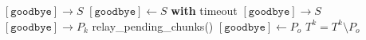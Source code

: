 \documentclass{article}
\begin{document}
\pagestyle{empty}

\newcommand{\send}{\Rightarrow}
\newcommand{\sendto}{\rightarrow}
\algrenewcommand{}

\begin{algorithmic}

  \Repeat
  \State $[\mathtt{goodbye}] \sendto S$
  \State $[\mathtt{goodbye}] \gets S$ \textbf{with} timeout
  \State $[\mathtt{goodbye}] \sendto S$
  \State $[\mathtt{goodbye}] \sendto P_k$
  \EndFor
  \State relay\_pending\_chunks()
  \EndProcedure
  \newline
  \State $[\mathtt{goodbye}] \gets P_o$
  \State $T^k = T^k \setminus P_o$
  \EndWhile
  \EndProcedure
  
\end{algorithmic}
\end{document}
